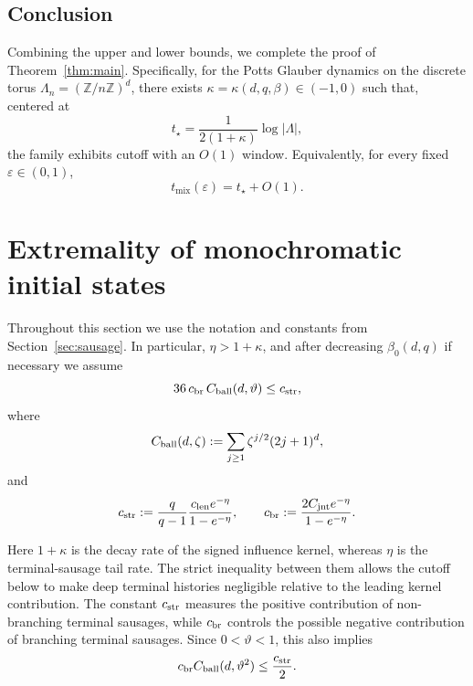 \documentclass[letterpaper,11pt,reqno]{amsart}
\theoremstyle{definition}
\begin{document}
\subsection{Conclusion}
Combining the upper and lower bounds, we complete the proof of Theorem~\ref{thm:main}. Specifically,
for the Potts Glauber dynamics on the discrete torus \(\Lambda_n=(\mathbb Z/n\mathbb Z)^d\), there exists
\(\kappa=\kappa(d,q,\beta)\in(-1,0)\) such that, centered at
\[
t_\star=\frac{1}{2(1+\kappa)}\log|\Lambda|,
\]
the family exhibits cutoff with an \(O(1)\) window. Equivalently, for every fixed \(\varepsilon\in(0,1)\),
\[
t_{\mathrm{mix}}(\varepsilon)=t_\star+O(1).
\]













\medskip

\section{Extremality of monochromatic initial states}\label{sec:extremality}

Throughout this section we use the notation and constants from Section~\ref{sec:sausage}.
In particular, \(\eta>1+\kappa\), and after decreasing \(\beta_0(d,q)\) if necessary we assume
\begin{equation}\label{eq:mono-smallness-final}
36\,c_{\rm br}\,C_{\rm ball}(d,\vartheta)\le c_{\rm str},
\end{equation}
where
\[
C_{\rm ball}(d,\zeta):=\sum_{j\ge1}\zeta^{j/2}(2j+1)^d,
\]
and
\[
c_{\rm str}:=\frac{q}{q-1}\frac{c_{\rm len}e^{-\eta}}{1-e^{-\eta}},
\qquad
c_{\rm br}:=\frac{2C_{\rm jnt}e^{-\eta}}{1-e^{-\eta}}.
\]


Here \(1+\kappa\) is the decay rate of the signed influence kernel, whereas \(\eta\) is the
terminal-sausage tail rate. The strict inequality between them allows the cutoff below to make
deep terminal histories negligible relative to the leading kernel contribution. The constant
\(c_{\rm str}\) measures the positive contribution of non-branching terminal sausages, while
\(c_{\rm br}\) controls the possible negative contribution of branching terminal sausages.
Since \(0<\vartheta<1\), this also implies
\[
c_{\rm br}C_{\rm ball}(d,\vartheta^2)\le \frac{c_{\rm str}}{2}.
\]
\end{document}

